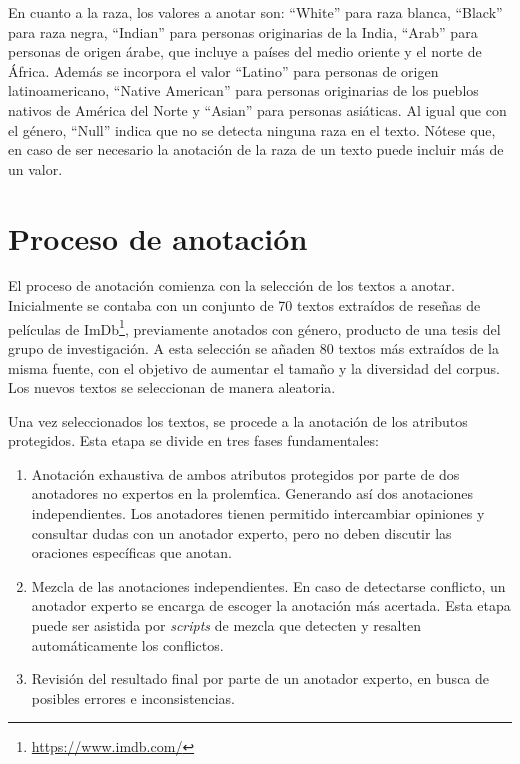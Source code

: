En cuanto a la raza, los valores a anotar son: ``White'' para raza blanca, ``Black'' para raza negra, ``Indian'' para 
personas originarias de la India, ``Arab'' para personas de origen \'arabe, que incluye a pa\'ises del medio oriente y el norte de 
\'Africa. Adem\'as se incorpora el valor ``Latino'' para personas de origen latinoamericano, ``Native American'' para personas 
originarias de los pueblos nativos de Am\'erica del Norte y ``Asian'' para personas asi\'aticas. Al igual que con el g\'enero, 
``Null'' indica que no se detecta ninguna raza en el texto. N\'otese que, en caso de ser necesario la anotaci\'on de la raza de un 
texto puede incluir m\'as de un valor.

\section{Proceso de anotaci\'on}\label{section:annotation_process}
El proceso de anotaci\'on comienza con la selecci\'on de los textos a anotar. Inicialmente se contaba con un conjunto de 70 textos 
extra\'idos de rese\~nas de pel\'iculas de ImDb\footnote{\url{https://www.imdb.com/}}, previamente anotados con g\'enero, producto 
de una tesis del grupo de investigaci\'on. A esta selecci\'on se a\~naden 80 textos m\'as extra\'idos de la misma fuente, con el 
objetivo de aumentar el tama\~no y la diversidad del corpus. Los nuevos textos se seleccionan de manera aleatoria.

Una vez seleccionados los textos, se procede a la anotaci\'on de los atributos protegidos. Esta etapa se divide en tres fases 
fundamentales:

\begin{enumerate}
    \item Anotaci\'on exhaustiva de ambos atributos protegidos por parte de dos anotadores no expertos en la prolem\'tica. 
    Generando as\'i dos anotaciones independientes. Los anotadores tienen permitido intercambiar opiniones y consultar dudas
    con un anotador experto, pero no deben discutir las oraciones espec\'ificas que anotan.
    \item Mezcla de las anotaciones independientes. En caso de detectarse conflicto, un anotador experto se encarga de escoger la 
    anotaci\'on m\'as acertada. Esta etapa puede ser asistida por \emph{scripts} de mezcla que detecten y resalten autom\'aticamente
    los conflictos.
    \item Revisi\'on del resultado final por parte de un anotador experto, en busca de posibles errores e inconsistencias.
\end{enumerate}

